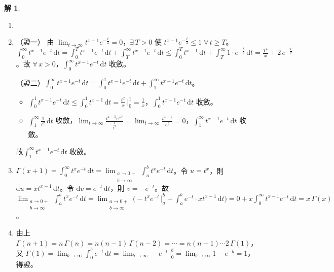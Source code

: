 \documentclass[12pt]{extarticle}
\newcommand{\ds}{\displaystyle}
\theoremstyle{definition}
\newtheorem*{sol}{解}
\begin{document}
\begin{sol}
  \begin{enumerate}\setlength{\itemsep}{0pt}
    \item[]
    \item（證一） 由 $\ds\lim_{t\to\infty}t^{x-1}e^{-\frac{t}{2}} = 0$，$\ds\exists\,T > 0$ 使 $\ds t^{x-1}e^{-\frac{t}{2}}\leqslant 1\;\forall\,t\geqslant T$。$\ds\int_0^\infty\!t^{x-1}e^{-t}\,\mathrm{d}t = \int_0^T\!t^{x-1}e^{-t}\,\mathrm{d}t + \int_T^\infty\!t^{x-1}e^{-t}\,\mathrm{d}t\leqslant\int_0^T\!t^{x - 1}\,\mathrm{d}t + \int_T^\infty 1\cdot e^{-\frac{t}{2}}\,\mathrm{d}t = \frac{T^x}{x} + 2\,e^{-\frac{T}{2}}$。故 $\forall\,x > 0$，$\ds\int_0^\infty\!t^{x-1}e^{-t}\,\mathrm{d}t$ 收斂。

     （證二）$\ds\int_0^\infty\!t^{x-1}e^{-t}\,\mathrm{d}t = \int_0^1\!t^{x - 1}e^{-t}\,\mathrm{d}t + \int_1^\infty\!t^{x - 1}e^{-t}\,\mathrm{d}t$。
      \begin{itemize}\setlength{\itemsep}{0pt}
        \item $\ds\int_0^1\!t^{x - 1}e^{-t}\,\mathrm{d}t\leqslant\int_0^1\!t^{x - 1}\,\text{d}t = \frac{t^x}{x}\,\Big|_0^1 = \frac{1}{x}$，$\ds\int_0^1\!t^{x - 1}e^{-t}\,\text{d}t$ 收斂。
        \item $\ds\int_1^\infty\!\frac{1}{t^2}\,\text{d}t$ 收斂，$\ds\lim_{t\to\infty}\frac{t^{x - 1}e^{-t}}{\frac{1}{t^2}} = \lim_{t\to\infty}\frac{t^{x + 1}}{e^t} = 0$，$\ds\int_1^\infty\!t^{x - 1}e^{-t}\,\text{d}t$ 收斂。
      \end{itemize}
      故$\ds\int_1^\infty\!t^{x - 1}e^{-t}\,\text{d}t$ 收斂。 
    \item $\ds\Gamma(x + 1) = \int_0^\infty\!t^x e^{-t}\,\mathrm{d}t = \lim_{\substack{a\to0+ \\ b\to\infty}}\int_a^b\!t^{x}e^{-t}\,\mathrm{d}t$。令 $\ds u = t^x$，則 $\ds\mathrm{d}u = xt^{x-1}\,\mathrm{d}t$。令 $\ds\mathrm{d}v = e^{-t}\,\mathrm{d}t$，則 $\ds v = -e^{-t}$。故 $\ds\lim_{\substack{a\to0+\\b\to\infty}}\int_a^b\!t^{x}e^{-t}\,\mathrm{d}t = \lim_{\substack{a\to0+\\b\to\infty}}\Big(-t^x e^{-t}\,\Big|_a^b + \int_a^b\!e^{-t}\cdot xt^{x-1}\,\mathrm{d}t\Big) = 0 + x\int_0^\infty\!t^{x-1}e^{-t}\,\mathrm{d}t =x\,\Gamma(x)$。
    \item 由上 $\ds\Gamma(n + 1) = n\,\Gamma(n) = n(n - 1)\,\Gamma(n - 2) = \cdots = n(n - 1)\cdots 2\,\Gamma(1)$，又 $\ds\Gamma(1) = \lim_{b\to\infty}\int_0^b e^{-t}\,\text{d}t = \lim_{b\to\infty}-e^{-t}\,\Big|_0^b = \lim_{b\to\infty} 1 - e^{-b} = 1$，得證。

\end{enumerate}
\end{sol}
\end{document}

